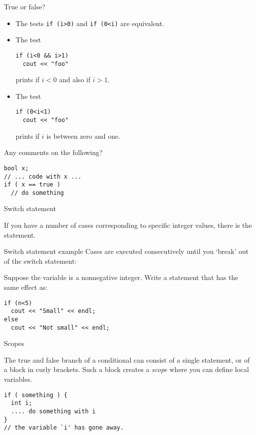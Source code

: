 \begin{review}
  \label{q:if}
  True or false?
  \begin{itemize}
  \item The tests \lstinline$if (i>0)$ and \lstinline$if (0<i)$ are equivalent.
  \item The test
\begin{lstlisting}
if (i<0 && i>1) 
  cout << "foo"
\end{lstlisting}
prints  if
    $i<0$ and also if $i>1$.
  \item The test 
\begin{lstlisting}
if (0<i<1)
  cout << "foo"
\end{lstlisting}
prints  if $i$ is
    between zero and one.
  \end{itemize}
  Any comments on the following?
\begin{lstlisting}
bool x;
// ... code with x ...
if ( x == true )
  // do something
\end{lstlisting}
\end{review}

 {Switch statement}

If you have a number of cases corresponding to specific integer
values, there is the  statement.

\begin{block}{Switch statement example}
  \label{sl:switch}
  Cases are executed consecutively until you `break' out of the switch
  statement:
\end{block}

\begin{exercise}
  \label{ex:switch-range}
  Suppose the variable  is a nonnegative integer. Write a
   statement that has the same effect as:
\begin{lstlisting}
if (n<5)
  cout << "Small" << endl;
else
  cout << "Not small" << endl;
\end{lstlisting}

\end{exercise}
 {Scopes}

The true and false branch of a conditional can consist of a single
statement, or of a block in curly brackets. Such a block creates a
%
\emph{scope}
%
where you can define local variables.

\begin{lstlisting}
if ( something ) {
  int i; 
  .... do something with i
}
// the variable `i' has gone away.
\end{lstlisting}

